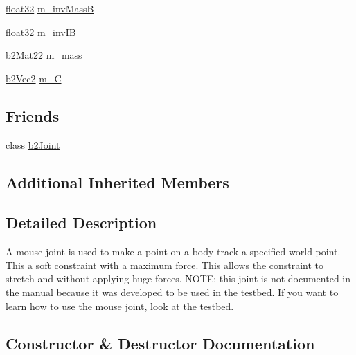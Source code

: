 \begin{DoxyCompactItemize}
\item 
\mbox{\hyperlink{b2_settings_8h_aacdc525d6f7bddb3ae95d5c311bd06a1}{float32}} \mbox{\hyperlink{classb2_mouse_joint_a84c405322a35b0f2649071cdcd7be0fb}{m\+\_\+inv\+MassB}}
\item 
\mbox{\hyperlink{b2_settings_8h_aacdc525d6f7bddb3ae95d5c311bd06a1}{float32}} \mbox{\hyperlink{classb2_mouse_joint_a0a4959ae588d0071d97424e36f15228e}{m\+\_\+inv\+IB}}
\item 
\mbox{\hyperlink{structb2_mat22}{b2\+Mat22}} \mbox{\hyperlink{classb2_mouse_joint_a628b7a7a2cd2b50313daea30baf47c4e}{m\+\_\+mass}}
\item 
\mbox{\hyperlink{structb2_vec2}{b2\+Vec2}} \mbox{\hyperlink{classb2_mouse_joint_a7ea02e17cdde70717e84bf44614275fb}{m\+\_\+C}}
\end{DoxyCompactItemize}
\subsection*{Friends}
\begin{DoxyCompactItemize}
\item 
class \mbox{\hyperlink{classb2_mouse_joint_a54ade8ed3d794298108d7f4c4e4793fa}{b2\+Joint}}
\end{DoxyCompactItemize}
\subsection*{Additional Inherited Members}


\subsection{Detailed Description}
A mouse joint is used to make a point on a body track a specified world point. This a soft constraint with a maximum force. This allows the constraint to stretch and without applying huge forces. N\+O\+TE\+: this joint is not documented in the manual because it was developed to be used in the testbed. If you want to learn how to use the mouse joint, look at the testbed. 

\subsection{Constructor \& Destructor Documentation}
\mbox{\label{classb2_mouse_joint_ad147d7989d884952c3389f7e5e3acf68}} 
